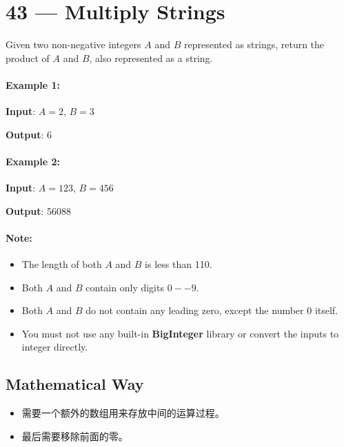 \section{43 --- Multiply Strings}
Given two non-negative integers $A$ and $B$ represented as strings, return the product of $A$ and $B$, also represented as a string.

\paragraph{Example 1:}

\begin{flushleft}
\textbf{Input}: $A = 2$, $B = 3$

\textbf{Output}: 6
\end{flushleft}

\paragraph{Example 2:}

\begin{flushleft}
\textbf{Input}: $A = 123$, $B = 456$

\textbf{Output}: 56088
\end{flushleft}

\paragraph{Note:}

\begin{itemize}
\item The length of both $A$ and $B$ is less than 110.
\item Both $A$ and $B$ contain only digits $0--9$.
\item Both $A$ and $B$ do not contain any leading zero, except the number 0 itself.
\item You must not use any built-in \textbf{BigInteger} library or convert the inputs to integer directly.
\end{itemize}

\subsection{Mathematical Way}
\begin{itemize}
\item 需要一个额外的数组用来存放中间的运算过程。
\item 最后需要移除前面的零。
\end{itemize}


